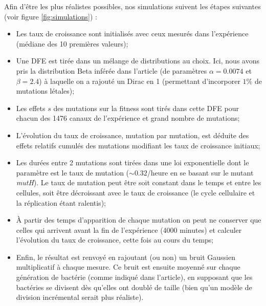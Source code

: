 \documentclass[12pt]{article}
\begin{document}
Afin d'être les plus réalistes possibles, nos simulations suivent les étapes suivantes (voir figure \ref{fig:simulations}) :
\begin{itemize}
\item Les taux de croissance sont initialisés avec ceux mesurés dans l'expérience (médiane des 10 premières valeurs);
\item Une DFE est tirée dans un mélange de distributions au choix. Ici, nous avons pris la distribution Beta inférée dans l'article (de paramètres $\alpha=0.0074$ et $\beta=2.4$) à laquelle on a rajouté un Dirac en 1 (permettant d'incorporer $1\%$ de mutations létales);
\item Les effets $s$ des mutations sur la fitness sont tirés dans cette DFE pour chacun des 1476 canaux de l'expérience et grand nombre de mutations;
\item L'évolution du taux de croissance, mutation par mutation, est déduite des effets relatifs cumulés des mutations modifiant les taux de croissance initiaux;
\item Les durées entre 2 mutations sont tirées dans une loi exponentielle dont le paramètre est le taux de mutation ($\sim0.32$/heure en se basant sur le mutant \emph{mutH}). Le taux de mutation peut être soit constant dans le temps et entre les cellules, soit être décroissant avec le taux de croissance (le cycle cellulaire et la réplication étant ralentis);
\item À partir des temps d'apparition de chaque mutation on peut ne conserver que celles qui arrivent avant la fin de l'expérience (4000 minutes) et calculer l'évolution du taux de croissance, cette fois au cours du temps;
\item Enfin, le résultat est renvoyé en rajoutant (ou non) un bruit Gaussien multiplicatif à chaque mesure. Ce bruit est ensuite moyenné sur chaque génération de bactérie (comme indiqué dans l'article), en supposant que les bactéries se divisent dès qu'elles ont doublé de taille (bien qu'un modèle de division incrémental serait plus réaliste).
\end{itemize}
\end{document}
